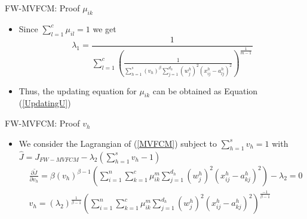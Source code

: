 \documentclass[compress,sky blue]{beamer}
\begin{document}
\begin{frame}{FW-MVFCM: Proof $\mu_{ik}$}
	\vspace{-0.3cm}	
    \begin{itemize}
    
    \item Since $\sum_{l=1}^{c}\mu_{il}=1 $ we get
  \begin{equation}
\lambda_{1}=\frac{1}{\sum_{l=1}^{c}\left(\frac{1}{\sum_{h=1}^{s}\left(v_{h}\right)^{\beta}\sum_{j=1}^{d_{h}} (w_j^{h})^2 \left(x_{ij}^{h}-a_{lj}^{h}\right)^2 }\right)^\frac{1}{m-1}}
\end{equation}
\item Thus, the updating equation for $\mu_{ik}$ can be obtained as Equation (\ref{UpdatingU})  
	\end{itemize}
\end{frame}

\begin{frame}{FW-MVFCM: Proof $v_{h}$}
	\vspace{-0.3cm}	
    \begin{itemize}
    
    \item We consider the Lagrangian of  (\ref{MVFCM}) subject to $\sum_{h=1}^{s}v_{h}=1 $ with  $\hat{J}=J_{FW-MVFCM}-\lambda_{2} \left(\sum_{h=1}^{s}v_{h}-1 \right)$
  \begin{align}
&\scriptstyle \frac{\partial \tilde{J}}{\partial v_{h}}=\beta \left(v_{h}\right)^{\beta-1}\left(\sum_{i=1}^{n}\sum_{k=1}^{c}  \mu_{ik}^{m} \sum_{j=1}^{d_{h}} (w_j^{h})^2  \left(x_{ij}^{h}-a_{kj}^{h}\right)^2\right)-\lambda_{2}=0\\
& v_{h}=\left(\lambda_{2}\right)^\frac{1}{\beta-1}\left(\sum_{i=1}^{n}\sum_{k=1}^{c}  \mu_{ik}^{m} \sum_{j=1}^{d_{h}} (w_j^{h})^2  \left(x_{ij}^{h}-a_{kj}^{h}\right)^2\right)^\frac{-1}{\beta-1}
\end{align}
	\end{itemize}
\end{frame}
\end{document}
